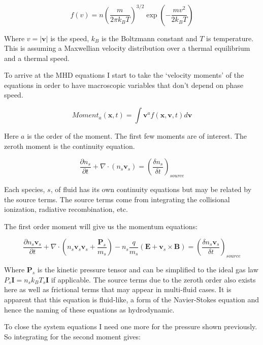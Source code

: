 \documentclass[12pt,upcase]{umlthesis}
\begin{document}
\begin{equation}
	f(v) = n {(\frac{m}{2\pi k_B T})}^{3/2} \exp{(-\frac{mv^2}{2k_B T})}
\end{equation}

Where $v = |\textbf{v}|$ is the speed, $k_B$ is the Boltzmann constant and $T$ is temperature. This is assuming a Maxwellian velocity distribution over a thermal equilibrium and a thermal speed.

To arrive at the MHD equations I start to take the `velocity moments' of the equations in order to have macroscopic variables that don't depend on phase speed.

\begin{equation}
	{Moment}_a(\textbf{x}, t) = \int{\textbf{v}^a f(\textbf{x}, \textbf{v}, t)}d\textbf{v}
\end{equation}

Here $a$ is the order of the moment. The first few moments are of interest. The zeroth moment is the continuity equation.

\begin{equation}\label{eq:continuityequation}
	\frac{\partial n_s}{\partial t} + \nabla \cdot (n_s \textbf{v}_s) = {(\frac{\delta n_s}{\delta t})}_{source}
\end{equation}

Each species, $s$, of fluid has its own continuity equations but may be related by the source terms. The source terms come from integrating the collisional ionization, radiative recombination, etc.

The first order moment will give us the momentum equations:

\begin{equation}\label{eq:momentumequation}
	\frac{\partial n_s \textbf{v}_s}{\partial t} + \nabla \cdot (n_s \textbf{v}_s \textbf{v}_s + \frac{\textbf{P}_s}{m_s} ) -n_s \frac{q}{m_s}(\textbf{E} + \textbf{v}_s \times \textbf{B}) = {(\frac{\delta n_s \textbf{v}_s}{\delta t})}_{source}
\end{equation}

Where $\textbf{P}_s$ is the kinetic pressure tensor and can be simplified to the ideal gas law $P_s\textbf{I} = n_s k_B T_s \textbf{I}$ if applicable. The source terms due to the zeroth order also exists here as well as frictional terms that may appear in multi-fluid cases. It is apparent that this equation is fluid-like, a form of the Navier-Stokes equation and hence the naming of these equations as hydrodynamic.

To close the system equations I need one more for the pressure shown previously. So integrating for the second moment gives: 
\end{document}
